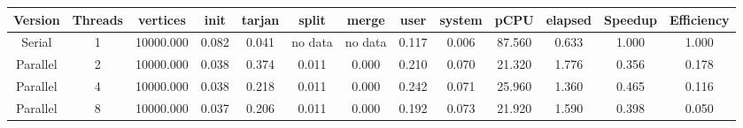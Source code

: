 \begin{tabular}{|c|c|c|c|c|c|c|c|c|c|c|c|c|}
\toprule
 Version &  Threads &  vertices &  init &  tarjan &   split &   merge &  user &  system &   pCPU &  elapsed &  Speedup &  Efficiency \\
\midrule
  Serial &        1 & 10000.000 & 0.082 &   0.041 & no data & no data & 0.117 &   0.006 & 87.560 &    0.633 &    1.000 &       1.000 \\
Parallel &        2 & 10000.000 & 0.038 &   0.374 &   0.011 &   0.000 & 0.210 &   0.070 & 21.320 &    1.776 &    0.356 &       0.178 \\
Parallel &        4 & 10000.000 & 0.038 &   0.218 &   0.011 &   0.000 & 0.242 &   0.071 & 25.960 &    1.360 &    0.465 &       0.116 \\
Parallel &        8 & 10000.000 & 0.037 &   0.206 &   0.011 &   0.000 & 0.192 &   0.073 & 21.920 &    1.590 &    0.398 &       0.050 \\
\bottomrule
\end{tabular}
